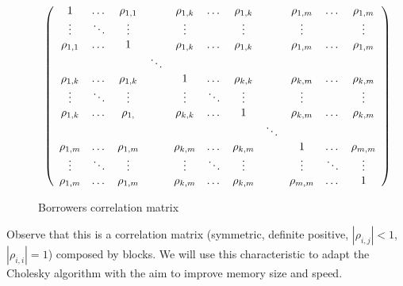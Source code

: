 \documentclass[a4paper,12pt,final]{article}
\begin{document}
\begin{figure}[!hb]
\begin{displaymath}
\begin{array}{c}
\left(
\begin{array}{ccccccccccc}
1           & \dots    & \rho_{1,1}  &          & \rho_{1,k}  & \dots   & \rho_{1,k}  &         & \rho_{1,m}  & \dots      & \rho_{1,m}  \cr
\vdots      & \ddots   & \vdots      &          & \vdots      &         & \vdots      &         & \vdots      &            & \vdots      \cr
\rho_{1,1}  & \dots    & 1           &          & \rho_{1,k}  & \dots   & \rho_{1,k}  &         & \rho_{1,m}  & \dots      & \rho_{1,m}  \cr

            &          &             & \ddots   &             &         &             &         &             &            &             \cr

\rho_{1,k}  & \dots    & \rho_{1,k}  &          & 1           & \dots   & \rho_{k,k}  &         & \rho_{k,m}  & \dots      & \rho_{k,m}  \cr
\vdots      & \ddots   & \vdots      &          & \vdots      & \ddots  & \vdots      &         & \vdots      &            & \vdots      \cr
\rho_{1,k}  & \dots    & \rho_{1, }  &          & \rho_{k,k}  & \dots   & 1           &         & \rho_{k,m}  & \dots      & \rho_{k,m}  \cr

            &          &             &          &             &         &             & \ddots  &             &            &             \cr

\rho_{1,m}  & \dots    & \rho_{1,m}  &          & \rho_{k,m}  & \dots   & \rho_{k,m}  &         & 1           & \dots      & \rho_{m,m}  \cr
\vdots      & \ddots   & \vdots      &          & \vdots      & \ddots  & \vdots      &         & \vdots      & \ddots     & \vdots      \cr
\rho_{1,m}  & \dots    & \rho_{1,m}  &          & \rho_{k,m}  & \dots   & \rho_{k,m}  &         & \rho_{m,m}  & \dots      & 1           \end{array}
\right)
\end{array}
\end{displaymath}
\caption{Borrowers correlation matrix}
\label{borrowercorrel}
\end{figure}

Observe that this is a correlation matrix (symmetric, definite positive, 
$|\rho_{i,j}| < 1$, $|\rho_{i,i}| = 1$) composed by blocks. We will use this 
characteristic to adapt the Cholesky algorithm with the aim to improve memory 
size and speed.

\end{document}
